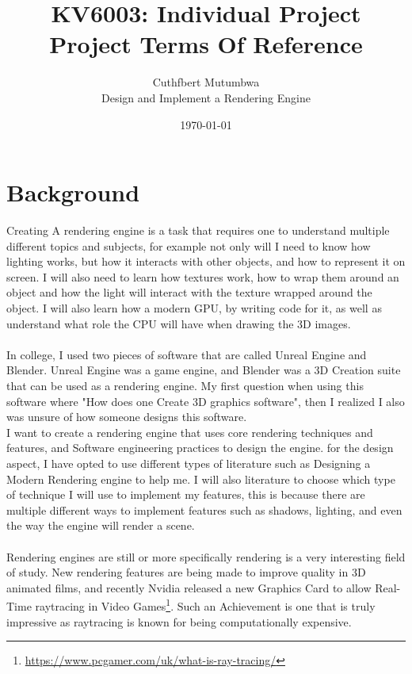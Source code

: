 \documentclass[]{article}
\begin{document}
\title{KV6003: Individual Project\\ Project Terms Of Reference}
\author{Cuthfbert Mutumbwa\\ Design and Implement a Rendering Engine}
\date{\today}

\maketitle

\section{Background}
Creating A rendering engine is a task that requires one to understand multiple different topics and subjects, for example not only will I need to know how lighting works, but how it interacts with other objects, and how to represent it on screen. I will also need to learn how textures work, how to wrap them around an object and how the light will interact with the texture wrapped around the object.
I will also learn how a modern GPU, by writing code for it, as well as understand what role the CPU will have when drawing the 3D images.
\\\\
In college, I used two pieces of software that are called Unreal Engine and Blender. Unreal Engine was a game engine, and Blender was a 3D Creation suite that can be used as a rendering engine.
My first question when using this software where "How does one Create 3D graphics software", then I realized I also was unsure of how someone designs this software.
\\
I want to create a rendering engine that uses core rendering techniques and features, and Software engineering practices to design the engine. for the design aspect, I have opted to use different types of literature such as Designing a Modern Rendering engine \cite{designengine} to help me.  I will also literature to choose which type of technique I will use to implement my features, this is because there are multiple different ways to implement features such as shadows, lighting, and even the way the engine will render a scene.
\\\\
Rendering engines are still or more specifically rendering is a very interesting field of study. New rendering features are being made to improve quality in 3D animated films, and recently Nvidia released a new Graphics Card to allow Real-Time raytracing in Video Games\footnote{\url{https://www.pcgamer.com/uk/what-is-ray-tracing/}}. Such an Achievement is one that is truly impressive as raytracing is known for being computationally expensive. 
\end{document}
